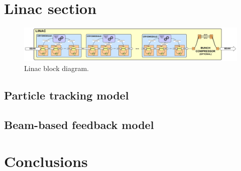 \documentclass[a4paper,12pt]{article}
\begin{document}
\newpage

\section{Linac section}

\begin{figure}
\centering
\includegraphics[scale=0.45]{../figures/Linac_block_diagram.png}
\caption{Linac block diagram.}
\label{fig:Linac_block_diagram}
\end{figure}

\subsection{Particle tracking model}

\subsection{Beam-based feedback model}

\section{Conclusions}

\newpage
\end{document}
